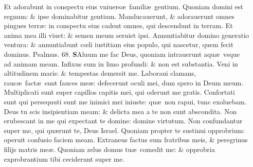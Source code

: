 \documentclass[a5paper,10pt]{book}
\def\ae{æ}
\def\oe{œ}
\begin{document}
\begin{multicols*}{2}
\newline \color{red} E\color{black}t adorabunt in conspectu eius vniuers\ae \ famili\ae \ gentium.
\newline \color{red} Q\color{black}uoniam domini est regnum: \& ipse dominabitur gentium.
\newline \color{red} M\color{black}anducauerunt, \& adorauerunt omnes pingues terr\ae : in conspectu eius cadent omnes, qui descendunt in terram.
\newline \color{red} E\color{black}t anima mea illi viuet: \& semen meum seruiet ipsi.
\newline \color{red} A\color{black}nnuntiabitur domino generatio ventura: \& annuntiabunt c\oe li iustitiam eius populo, qui nascetur, quem fecit dominus. \quad \color{red} Psalmus. \hypertarget{ps68}{68.} \color{black}
\vspace{-1em}
\lettrine[lines=2]{\bfseries \color{red} S}{}Aluum me fac Deus, quoniam intrauerunt aqu\ae \ vsque ad animam meam.
\newline \color{red} I\color{black}nfixus sum in limo profundi: \& non est substantia.
\newline \color{red} V\color{black}eni in altitudinem maris: \& tempestas demersit me.
\newline \color{red} L\color{black}aboraui clamans, rauc\ae \ fact\ae \ sunt fauces me\ae : defecerunt oculi mei, dum spero in Deum meum.
\newline \color{red} M\color{black}ultiplicati sunt super capillos capitis mei, qui oderunt me gratis.
\newline \color{red} C\color{black}onfortati sunt qui persequuti sunt me inimici mei iniuste: qu\ae \ non rapui, tunc exoluebam.
\newline \color{red} D\color{black}eus tu scis insipientiam meam: \& delicta mea a te non sunt abscondita.
\newline \color{red} N\color{black}on erubescant in me qui expectant te domine: domine virtutum.
\newline \color{red} N\color{black}on confundantur super me, qui qu\ae runt te, Deus Israel.
\newline \color{red} Q\color{black}uoniam propter te sustinui opprobrium: operuit confusio faciem meam.
\newline \color{red} E\color{black}xtraneus factus sum fratribus meis, \& peregrinus filijs matris me\ae .
\newline \color{red} Q\color{black}uoniam zelus domus tu\ae \ comedit me: \& opprobria exprobrantium tibi ceciderunt super me.

\end{multicols*}
\end{document}
